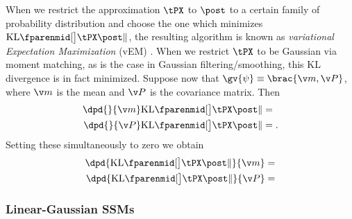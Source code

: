 When we restrict the approximation $\tPX$ to $\post$ to a certain
family of probability distribution and choose the one which
minimizes $\KL{\tPX}{\post}$, the resulting algorithm is known
as \emph{variational Expectation Maximization} (vEM) \parencite{Turner2011}.
When we restrict $\tPX$ to be Gaussian via moment matching, as is the case
in Gaussian filtering/smoothing, this KL divergence is in fact minimized.
Suppose now that $\gv{\psi}\equiv \brac{\m,\P}$, where $\m$ is the mean and 
$\P$ is the covariance matrix. Then
\begin{align}
	\dpd{}{\m}\KL{\tPX}{\post} &= \\
	\dpd{}{\P}\KL{\tPX}{\post} &=.
\end{align}
Setting these simultaneously to zero we obtain
\begin{align}
	\dpd{\KL{\tPX}{\post}}{\m} &= \\
	\dpd{\KL{\tPX}{\post}}{\P} &=
\end{align}


\subsubsection{Linear-Gaussian SSMs}%
\label{sec:EM_SSM}

